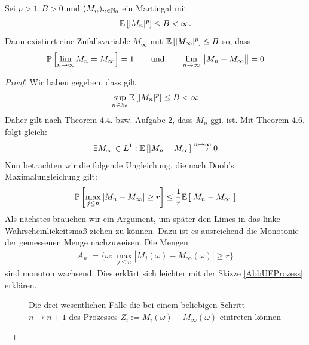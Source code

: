 \documentclass[12pt,a4paper]{article}
\begin{document}
\begin{theorem}\enter
Sei $p>1,B>0$ und $(M_n)_{n\in\mathbb{N}_0}$ ein Martingal mit 
\begin{align*}
\mathbb{E}\left[|M_n|^p\right]\leq B<\infty.
\end{align*}
Dann existiert eine Zufallsvariable $M_\infty$ mit $\mathbb{E}\left[|M_\infty|^p\right]\leq B$ so, dass
\begin{align*}
\mathbb{P}\left[\lim\limits_{n\to\infty} M_n=M_\infty\right]=1
\qquad\text{und}\qquad
\lim\limits_{n\to\infty}\big\Vert M_n-M_\infty\big\Vert=0
\end{align*}
\end{theorem}
\begin{proof}
	Wir haben gegeben, dass gilt
	\begin{align*}
		\sup\limits_{n\in\mathbb{N}_0} \mathbb{E}\left[|M_n|^p\right] \leq B < \infty
	\end{align*}
	Daher gilt nach Theorem 4.4. bzw. Aufgabe 2, dass $M_n$ ggi. ist.
	Mit Theorem 4.6. folgt gleich:
	\begin{align*}
		\exists M_\infty \in L^1 : \mathbb{E}\left[|M_n - M_\infty\right]\stackrel{n\rightarrow \infty}{\longrightarrow} 0
	\end{align*}
	Nun betrachten wir die folgende Ungleichung, die nach Doob's Maximalungleichung gilt:
	\begin{align*}
		\mathbb{P}\left[\max\limits_{j\leq n} |M_n - M_\infty| \geq r\right] \leq \frac{1}{r} \mathbb{E}\left[|M_n-M_\infty|\right]
	\end{align*}
	Als nächstes brauchen wir ein Argument, um später den Limes in das linke Wahrscheinlickeitsmaß ziehen zu können. Dazu ist es ausreichend die Monotonie der gemessenen Menge nachzuweisen. Die Mengen
	\begin{align*}
		A_n:=\lbrace \omega : \max\limits_{j\leq n} |M_j(\omega) - M_\infty(\omega)| \geq r\rbrace
	\end{align*}
	sind monoton wachsend. Dies erklärt sich leichter mit der Skizze \ref{AbbUEProzess} erklären.
	\begin{figure}
			\caption{Die drei wesentlichen Fälle die bei einem beliebigen Schritt $n\rightarrow n+1$ des Prozesses $Z_i:=M_i(\omega)-M_\infty(\omega)$ eintreten können}

\end{figure}
\end{proof}
\end{document}
